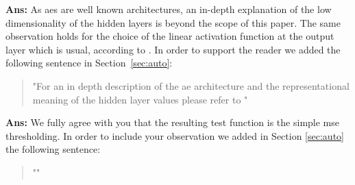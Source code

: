 \documentclass[draftcls,onecolumn,12pt]{IEEEtran}
\newcounter{revc}
\newcommand{\revp}[1]{\zref[revcontent]{#1}}
\begin{document}
{\bf Ans:} As \acp{ae} are well known architectures, an in-depth explanation of the low dimensionality of the hidden layers is beyond the scope of this paper. The same observation holds for the choice of the linear activation function at the output layer which is usual, according to \cite[Chapter 14]{goodfellow}. In order to support the reader we added the following sentence in Section~\ref{sec:auto}:

\begin{quote}
    "For an in depth description of the \ac{ae} architecture and the representational meaning of the hidden layer values please refer to \cite[Chapter 14]{goodfellow}"
\end{quote}

\vspace{5mm} %
\begin{framed}
\end{framed}

{\bf Ans:} We fully agree with you that the resulting test function is the simple \ac{mse} thresholding. In order to include your observation we added in Section \ref{sec:auto} the following sentence:

\begin{quote}
    "\revp{mseThresholding}"
\end{quote}
\end{document}
